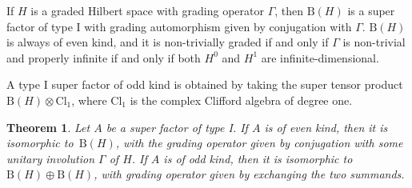 \documentclass[pdftex]{sigma}
\numberwithin{equation}{section}
\newtheorem{Theorem}{Theorem}[section]
\newcommand{\B}{\mathrm{B}}
\newcommand{\Cl}{\mathrm{Cl}}
\begin{document}
\begin{Example} \label{ExampleOddKind}
If $H$ is a graded Hilbert space with grading operator $\Gamma$, then $\B(H)$ is a super factor of type I with grading automorphism given by conjugation with $\Gamma$.
$\B(H)$ is always of even kind, and it is non-trivially graded if and only if $\Gamma$ is non-trivial and properly infinite if and only if both $H^0$ and $H^1$ are infinite-dimensional.
\end{Example}

\begin{Example} \label{ExampleEvenKind}
A type I super factor of odd kind is obtained by taking the super tensor product~${\B(H) \otimes \Cl_1}$, where $\Cl_1$ is the complex Clifford algebra of degree one.
\end{Example}


\begin{Theorem}
\label{ThmClassificationSuperFactorI}
Let $A$ be a super factor of type I.
If $A$ is of even kind, then it is isomorphic to~$\B(H)$, with the grading operator given by conjugation with some unitary involution $\Gamma$ of $H$.
If $A$ is of odd kind, then it is isomorphic to $\B(H) \oplus \B(H)$, with grading operator given by exchanging the two summands.
\end{Theorem}
\end{document}
